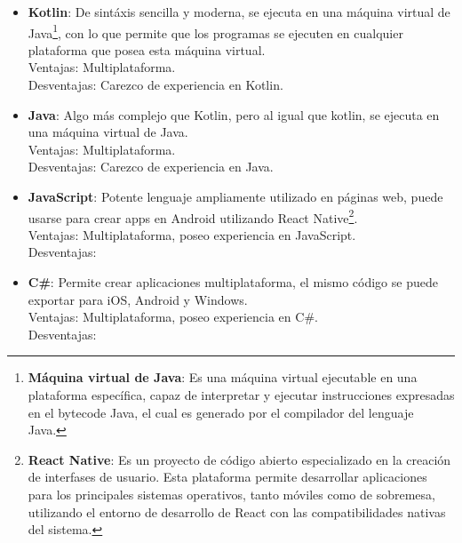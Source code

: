 \documentclass{report}
\begin{document}
\begin{itemize}
\item \textbf{Kotlin}: De sintáxis sencilla y moderna, se ejecuta en una máquina virtual de Java\footnote{\textbf{Máquina virtual de Java}: Es una máquina virtual ejecutable en una plataforma específica, capaz de interpretar y ejecutar instrucciones expresadas en el bytecode Java, el cual es generado por el compilador del lenguaje Java.}, con lo que permite que los programas se ejecuten en cualquier plataforma que posea esta máquina virtual. \\Ventajas: Multiplataforma. \\Desventajas: Carezco de experiencia en Kotlin.
\item \textbf{Java}: Algo más complejo que Kotlin, pero al igual que kotlin, se ejecuta en una máquina virtual de Java. \\Ventajas: Multiplataforma. \\Desventajas: Carezco de experiencia en Java.
\item \textbf{JavaScript}: Potente lenguaje ampliamente utilizado en páginas web, puede usarse para crear apps en Android utilizando React Native\footnote{\textbf{React Native}: Es un proyecto de código abierto especializado en la creación de interfases de usuario. Esta plataforma permite desarrollar aplicaciones para los principales sistemas operativos, tanto móviles como de sobremesa, utilizando el entorno de desarrollo de React con las compatibilidades nativas del sistema.}. \\Ventajas: Multiplataforma, poseo experiencia en JavaScript. \\Desventajas: 
\item \textbf{C\#}: Permite crear aplicaciones multiplataforma, el mismo código se puede exportar para iOS, Android y Windows. \\Ventajas: Multiplataforma, poseo experiencia en C\#. \\Desventajas: 
\end{itemize}
\end{document}
